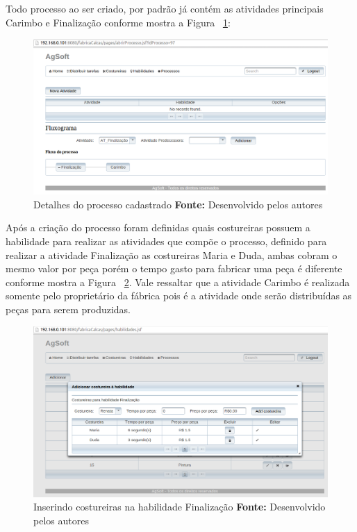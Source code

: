 \par Todo processo ao ser criado, por padrão já contém as atividades principais
 Carimbo e Finalização conforme mostra a Figura ~\ref{fig:processo_cadastrado}:

\begin{figure}[h!]
	\centerline{\includegraphics[scale=0.4]{./imagens/tela_processo_teste1.png}}
	\caption[Detalhes do processo cadastrado]
	{Detalhes do processo cadastrado \textbf{Fonte:} Desenvolvido pelos autores}
	\label{fig:processo_cadastrado}
\end{figure}

\par Após a criação do processo foram definidas quais costureiras possuem a
habilidade para realizar as atividades que compõe o processo, definido para 
realizar a atividade Finalização as costureiras Maria e Duda, ambas cobram o 
mesmo valor por peça porém o tempo gasto para fabricar uma peça é diferente 
conforme mostra a Figura ~\ref{fig:costureira_habilidade}. Vale ressaltar que
a atividade Carimbo é realizada somente pelo proprietário da fábrica pois é a
atividade onde serão distribuídas as peças para serem produzidas. 

\newpage

\begin{figure}[h!]
	\centerline{\includegraphics[scale=0.4]{./imagens/tela_habilidade_teste1.png}}
	\caption[Inserindo costureiras na habilidade Finalização]
	{Inserindo costureiras na habilidade Finalização \textbf{Fonte:} Desenvolvido
	pelos autores}
	\label{fig:costureira_habilidade}
\end{figure}


